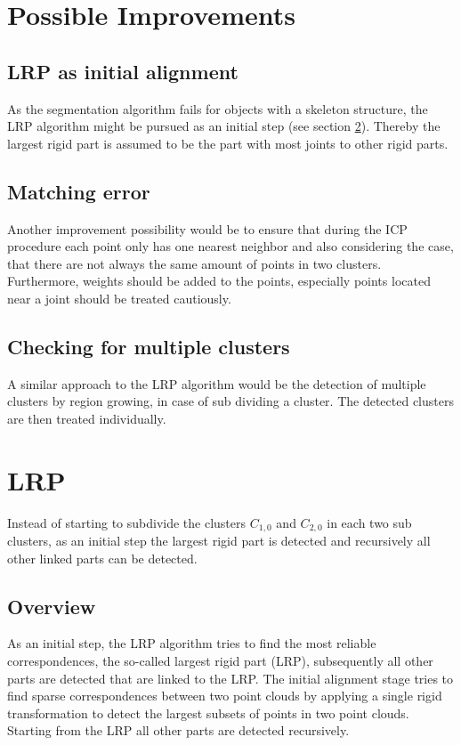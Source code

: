 \documentclass[notitlepage,english]{hgbreport}
\begin{document}
	\section{Possible Improvements}
	
	\subsection{LRP as initial alignment}
	As the segmentation algorithm fails for objects with a skeleton structure, the LRP algorithm might be pursued as an initial step (see section \ref{sec:LRP}). Thereby the largest rigid part is assumed to be the part with most joints to other rigid parts. 
	
	\subsection{Matching error}
	Another improvement possibility would be to ensure that during the ICP procedure each point only has one nearest neighbor and also considering the case, that there are not always the same amount of points in two clusters. Furthermore, weights should be added to the points, especially points located near a joint should be treated cautiously. 
	
	\subsection{Checking for multiple clusters}
	A similar approach to the LRP algorithm \cite{guo2016correspondence} would be the detection of multiple clusters by region growing, in case of sub dividing a cluster. The detected clusters are then treated individually.
	
	\section{LRP}
	\label{sec:LRP}
	Instead of starting to subdivide the clusters $C_{1,0}$ and $C_{2,0}$ in each two sub clusters, as an initial step the largest rigid part is detected and recursively all other linked parts can be detected.
	
	\subsection{Overview}
	As an initial step, the LRP algorithm tries to find the most reliable correspondences, the so-called largest rigid part (LRP), subsequently all other parts are detected that are linked to the LRP. The initial alignment stage tries to find sparse correspondences between two point clouds by applying a single rigid transformation to detect the largest subsets of points in two point clouds. Starting from the LRP all other parts are detected recursively.
\end{document}
